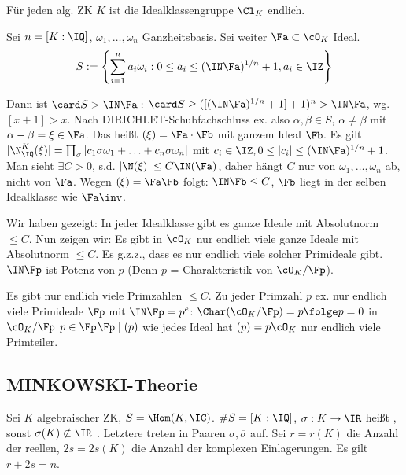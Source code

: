  \begin{Satz}
  Für jeden alg. ZK $K$ ist die Idealklassengruppe $\Cl_K$ endlich.
 \end{Satz}
 
 \begin{Beweis}
  Sei $n=[K:\IQ]$, $\omega_1,\ldots,\omega_n$ Ganzheitsbasis. Sei weiter $\Fa\subset \cO_K$ Ideal.
  \[ S:= \left\lbrace \sum_{i=1}^n a_i\omega_i : 0\leq a_i\leq (\IN \Fa)^{1/n}+1, a_i\in\IZ\right\rbrace\]
  
  Dann ist $\card S > \IN\Fa:$
  $\card S\geq ([(\IN\Fa)^{1/n}+1]+1)^n> \IN\Fa$, wg. $[x+1]>x$. Nach DIRICHLET-Schubfachschluss ex. also $\alpha,\beta\in S$, $\alpha\neq \beta$ mit $\alpha-\beta=\xi\in\Fa$. Das heißt $(\xi)=\Fa\cdot\Fb$ mit ganzem Ideal $\Fb$. Es gilt $|\N_{\IQ}^K(\xi)|=\prod_{\sigma}|c_1\sigma\omega_1+\ldots+c_n\sigma\omega_n|$
  mit $c_i\in\IZ, 0\leq |c_i|\leq (\IN\Fa)^{1/n}+1$. Man sieht $\exists C>0$, s.d. $|\N(\xi)|\leq C\IN(\Fa)$, daher hängt $C$ nur von $\omega_1,\ldots,\omega_n$ ab, nicht von $\Fa$. Wegen $(\xi)=\Fa\Fb$ folgt: $\IN\Fb\leq C$, $\Fb$ liegt in der selben Idealklasse wie $\Fa\inv$.
  
  Wir haben gezeigt: In jeder Idealklasse gibt es ganze Ideale mit Absolutnorm $\leq C$.
  Nun zeigen wir: Es gibt in $\cO_K$ nur endlich viele ganze Ideale mit Absolutnorm $\leq C$. Es g.z.z., dass es nur endlich viele solcher Primideale gibt. $\IN\Fp$ ist Potenz von $p$ (Denn $p$ = Charakteristik von $\cO_K/\Fp$). 
  
  Es gibt nur endlich viele Primzahlen $\leq C$.
  Zu jeder Primzahl $p$ ex. nur endlich viele Primideale $\Fp$ mit $\IN\Fp=p^e$: $\Char(\cO_K/\Fp)=p\folge p=0$ in $\cO_K/\Fp$ \folge $p\in\Fp$\folge $\Fp\mid (p)$ wie jedes Ideal hat $(p)=p\cO_K$ nur endlich viele Primteiler.
  \end{Beweis}
  
  \subsection{MINKOWSKI-Theorie}
   
   Sei $K$ algebraischer ZK, $S=\Hom(K,\IC)$. $\# S=[K:\IQ]$, $\sigma: K\rightarrow\IR$ heißt , sonst $\sigma(K)\not\subset \IR$ . Letztere treten in Paaren $\sigma,\overline{\sigma}$ auf.
   Sei $r=r(K)$ die Anzahl der reellen, $2s=2s(K)$ die Anzahl der komplexen Einlagerungen. Es gilt $r+2s=n$.
   
